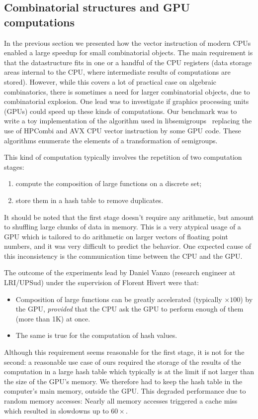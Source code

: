 \documentclass{deliverablereport}
\begin{document}
\subsection{Combinatorial structures and GPU computations}

In the previous section we presented how the vector instruction of modern
CPUs enabled a large speedup for small combinatorial objects. The main
requirement is that the datastructure fits in one or a
handful of the CPU registers (data storage areas internal to the CPU, where
intermediate results of computations are stored). However, while this
covers a lot of practical case on algebraic combinatorics,  there is sometimes a
need for larger combinatorial objects, due to combinatorial
explosion. One lead was to investigate if graphics
processing units (GPUs) could speed up these kinds of computations. Our benchmark was to write a
toy implementation of the algorithm used in libsemigroups~\cite{libsemigroups}
replacing the use of HPCombi and AVX CPU vector instruction by some GPU
code. These algorithms enumerate the elements of a transformation of semigroups.

This kind of computation typically involves the repetition of two computation
stages:
\begin{enumerate}
\item compute the composition of large functions on a discrete set;
\item store them in a hash table to remove duplicates.
\end{enumerate}
It should be noted that the first stage doesn't require any arithmetic, but
amount to shuffling large chunks of data in memory. This is a very atypical usage of a
GPU which is tailored to do arithmetic on larger vectors of floating point numbers, and it was very difficult
to predict the behavior. One expected cause of this inconsistency is the communication time
between the CPU and the GPU.
\medskip

The outcome of the experiments lead by Daniel Vanzo (research engineer at
LRI/UPSud) under the supervision of Florent Hivert were that:
\begin{itemize}
\item Composition of large functions can be greatly accelerated (typically
$\times 100$) by the GPU, \emph{provided} that the CPU ask the GPU to perform
enough of them (more than 1K) at once.
\item The same is true for the computation of hash values.
\end{itemize}
Although this requirement seems reasonable for the first stage, it is not for
the second: a reasonable use case of ours required the storage of the results of the
computation in a large hash table which typically is at the limit if not
larger than the size of the GPU's memory. We  therefore had to keep the hash table
in the computer's main memory, outside the GPU. This degraded performance due to
random memory accesses: Nearly all
memory accesses triggered a cache miss which resulted in slowdowns up to
$60\times$. \bigskip
\end{document}

